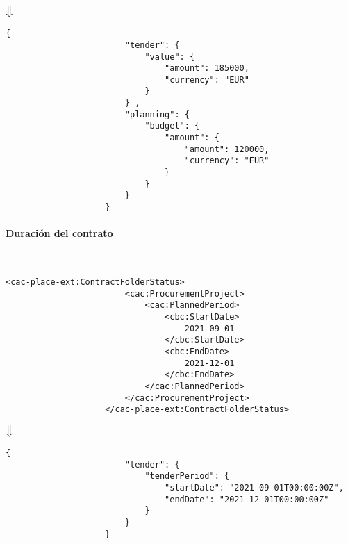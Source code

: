                 \begin{center}
                    $\big\Downarrow$
                \end{center}
                
                \begin{lstlisting}[language=lJSON]
                    {
                        "tender": {
                            "value": {
                                "amount": 185000,
                                "currency": "EUR"
                            }
                        } ,
                        "planning": {
                            "budget": {
                                "amount": {
                                    "amount": 120000,
                                    "currency": "EUR"
                                }
                            }
                        }
                    }
                \end{lstlisting}
                
            \paragraph{Duración del contrato} \mbox{}\\
                \begin{lstlisting}[language=lXML]
                    <cac-place-ext:ContractFolderStatus>
                        <cac:ProcurementProject>
                            <cac:PlannedPeriod>
                                <cbc:StartDate>
                                    2021-09-01
                                </cbc:StartDate>
                                <cbc:EndDate>
                                    2021-12-01
                                </cbc:EndDate>
                            </cac:PlannedPeriod>
                        </cac:ProcurementProject>
                    </cac-place-ext:ContractFolderStatus>
                \end{lstlisting}
                
                \begin{center}
                    $\big\Downarrow$
                \end{center}
                
                \begin{lstlisting}[language=lJSON]
                    {
                        "tender": {
                            "tenderPeriod": {
                                "startDate": "2021-09-01T00:00:00Z",
                                "endDate": "2021-12-01T00:00:00Z"
                            }
                        }
                    }
                \end{lstlisting}
                
